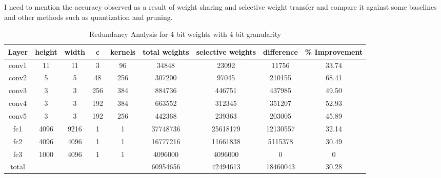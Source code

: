 \documentclass[conference]{IEEEtran}
\begin{document}
\color{black}

\color{magenta}
I  need to mention the accuracy observed as a result of weight sharing and selective weight transfer and compare it against some baselines and other methods such as quantization and pruning.
\color{black}

\begin{table}[!ht]
\centering
\caption{Redundancy Analysis for 4 bit weights with 4 bit granularity}
\label{Red_Anal}
\begin{tabular}{ccccccccc}
\hline
Layer & height    & width    & c   & kernels & total weights & selective weights  & difference & \% Improvement \\ \hline
conv1 & 11   & 11   & 3   & 96      & 34848         & 23092             & 11756      & 33.74          \\
conv2 & 5    & 5    & 48  & 256     & 307200        & 97045             & 210155     & 68.41          \\
conv3 & 3    & 3    & 256 & 384     & 884736        & 446751            & 437985     & 49.50          \\
conv4 & 3    & 3    & 192 & 384     & 663552        & 312345             & 351207     & 52.93          \\
conv5 & 3    & 3    & 192 & 256     & 442368        & 239363             & 203005     & 45.89          \\
fc1   & 4096 & 9216 & 1   & 1       & 37748736      & 25618179         & 12130557   & 32.14          \\
fc2   & 4096 & 4096 & 1   & 1       & 16777216      & 11661838          & 5115378    & 30.49          \\
fc3   & 1000 & 4096 & 1   & 1       & 4096000       & 4096000           & 0          & 0              \\ \hline
total &      &      &     &         & 60954656      & 42494613          & 18460043   & 30.28          \\ \hline
\end{tabular}
\end{table}
\end{document}
